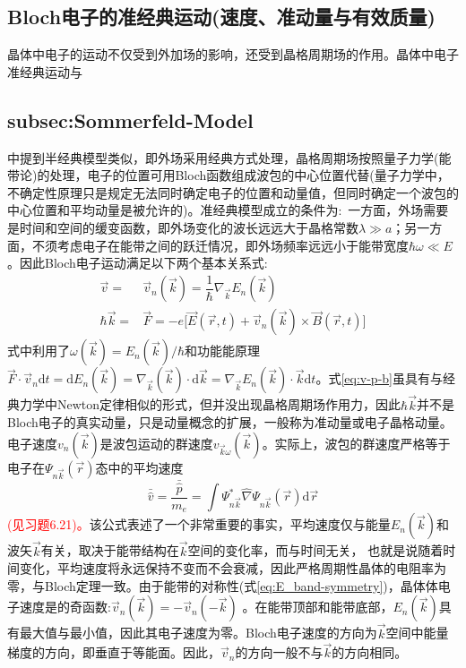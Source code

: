 \subsection{Bloch电子的准经典运动(速度、准动量与有效质量)} 
晶体中电子的运动不仅受到外加场的影响，还受到晶格周期场的作用。晶体中电子准经典运动与\subsection{subsec:Sommerfeld-Model}中提到半经典模型类似，即外场采用经典方式处理，晶格周期场按照量子力学(能带论)的处理，电子的位置可用Bloch函数组成波包的中心位置代替(量子力学中，不确定性原理只是规定无法同时确定电子的位置和动量值，但同时确定一个波包的中心位置和平均动量是被允许的)。准经典模型成立的条件为:~一方面，外场需要是时间和空间的缓变函数，即外场变化的波长远远大于晶格常数$\lambda\gg a$；另一方面，不须考虑电子在能带之间的跃迁情况，即外场频率远远小于能带宽度$\hbar\omega\ll E$。因此Bloch电子运动满足以下两个基本关系式:
\begin{subequations}
	\begin{align}
		\vec v=&\vec v_n(\vec k)=\dfrac1{\hbar}\nabla_{\vec k}E_n(\vec k)
	\label{eq:v-p-a}\\
	\hbar\vec k=&\vec F=-e\bigg[\vec E(\vec r,t)+\vec v_n(\vec k)\times\vec B(\vec r,t)\bigg]
	\label{eq:v-p-b}
	\end{align}
\label{eq:v-p}
\end{subequations} 
式中利用了$\omega(\vec k)=E_n(\vec k)/\hbar$和功能能原理$\vec F\cdot \vec v_n\mathrm{d}t=\mathrm{d}E_n(\vec k)=\nabla_{\vec k}(\vec k)\cdot\mathrm{d}\vec k=\nabla_{\vec k}E_n(\vec k)\cdot\vec k\mathrm{d}t$。式\eqref{eq:v-p-b}虽具有与经典力学中Newton定律相似的形式，但并没出现晶格周期场作用力，因此$\hbar\vec k$并不是Bloch电子的真实动量，只是动量概念的扩展，一般称为准动量或电子晶格动量。电子速度$v_n(\vec k)$是波包运动的群速度$v_{\vec k\omega}(\vec k)$。实际上，波包的群速度严格等于电子在$\Psi_{n\vec k}(\vec r)$态中的平均速度
\begin{displaymath}
	\bar{\hat v}=\dfrac{\bar{\hat p}}{m_e}=\int\Psi_{n\vec k}^{\ast}\hat{\nabla}\Psi_{n\vec k}(\vec r)\mathrm{d}\vec r
\end{displaymath}
\textcolor{red}{(见习题6.21)。}该公式表述了一个非常重要的事实，平均速度仅与能量$E_n(\vec k)$和波矢$\vec k$有关，取决于能带结构在$\vec k$空间的变化率，而与时间无关，%
也就是说随着时间变化，平均速度将永远保持不变而不会衰减，因此严格周期性晶体的电阻率为零，与Bloch定理一致。由于能带的对称性(式\eqref{eq:E_band-symmetry})，晶体体电子速度是的奇函数:$\vec v_n(\vec k)=-\vec v_n(-\vec k)$%
。在能带顶部和能带底部，$E_n(\vec k)$具有最大值与最小值，因此其电子速度为零。Bloch电子速度的方向为$\vec k$空间中能量梯度的方向，即垂直于等能面。因此，$\vec v_n$的方向一般不与$\vec k$的方向相同。

